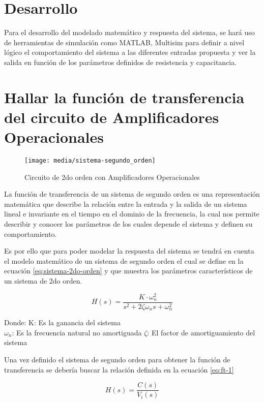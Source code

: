 \documentclass[conference]{IEEEtran}
\begin{document}
	\section{Desarrollo}
	Para el desarrollo del modelado matemático y respuesta del sistema, se hará uso de herramientas de simulación como MATLAB, Multisim para definir a nivel lógico el comportamiento del sistema a las diferentes entradas propuesta y ver la salida en función de los parámetros definidos de resistencia y capacitancia.
	
	
	\section{Hallar la función de transferencia del circuito de Amplificadores Operacionales}
	
	\begin{figure}
		\centering
		\texttt{[image: media/sistema-segundo\_orden]}
		\caption{Circuito de 2do orden con Amplificadores Operacionales}
		\label{fig:sistema-segundoorden}
	\end{figure}
	
	La función de transferencia de un sistema de segundo orden es una representación matemática que describe la relación entre la entrada y la salida de un sistema lineal e invariante en el tiempo en el dominio de la frecuencia, la cual nos permite describir y conocer los parámetros de los cuales depende el sistema y definen su comportamiento.
	
	Es por ello que para poder modelar la respuesta del sistema se tendrá en cuenta el modelo matemático de un sistema de segundo orden el cual se define en la ecuación \ref{eq:sistema-2do-orden} y que muestra los parámetros característicos de un sistema de 2do orden.
	
	\begin{equation}
		H(s) = \frac{K \cdot \omega_n^2}{s^2 + 2\zeta\omega_n s + \omega_n^2}
		\label{eq:sistema-2do-orden}
	\end{equation}
	
	Donde:
	K: Es la ganancia del sistema \\
	$\omega_n$: Es la frecuencia natural no amortiguada
	$\zeta$: El factor de amortiguamiento del sistema
	
	Una vez definido el sistema de segundo orden para obtener la función de transferencia se debería buscar la relación definida en la ecuación \ref{eq:ft-1}
	
	\begin{equation}
		H(s) = \frac{C(s)}{V_i(s)}
		\label{eq:ft-1}
	\end{equation}
	
\end{document}
